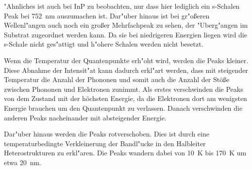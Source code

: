 "Ahnliches ist auch bei InP zu beobachten, nur dass hier lediglich ein s-Schalen Peak bei \SI{752}{nm} auszumachen ist.
Dar"uber hinaus ist bei gr"o{\ss}eren Wellenl"angen auch noch ein gro{\ss}er Mehrfachpeak zu sehen, der "Uberg"angen im Substrat zugeordnet werden kann.
Da sie bei niedrigeren Energien liegen wird die s-Schale nicht ges"attigt und h"ohere Schalen werden nicht besetzt.

Wenn die Temperatur der Quantenpunkte erh"oht wird, werden die Peaks kleiner.
Diese Abnahme der Intensit"at kann dadurch erkl"art werden, dass mit steigender Temperatur die Anzahl der Phononen und somit auch die Anzahl der Stöße zwischen Phononen und Elektronen zunimmt. 
Als erstes verschwinden die Peaks von dem Zustand mit der höchsten Energie, da die Elektronen dort am wenigsten Energie brauchen um den Quantenpunkt zu verlassen. 
Danach verschwinden die anderen Peaks nacheinander mit absteigender Energie. 


Dar"uber hinaus werden die Peaks rotverschoben.
Dies ist durch eine temperaturbedingte Verkleinerung der Bandl"ucke in den Halbleiter Heterostrukturen zu erkl"aren.
Die Peaks wandern dabei von \SI{10}{\kelvin} bis \SI{170}{\kelvin} um etwa \SI{20}{\nano\metre}.
